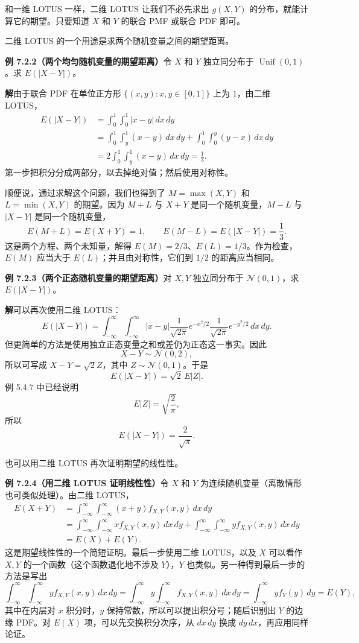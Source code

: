 \documentclass[UTF8,12pt,a4paper,fontset=fandol]{ctexart}
\begin{document}
和一维 LOTUS 一样，二维 LOTUS 让我们不必先求出 $g(X,Y)$ 的分布，就能计算它的期望。只要知道 $X$ 和 $Y$ 的联合 PMF 或联合 PDF 即可。

二维 LOTUS 的一个用途是求两个随机变量之间的期望距离。

\noindent\textbf{例 7.2.2（两个均匀随机变量的期望距离）}\quad 令 $X$ 和 $Y$ 独立同分布于 $\operatorname{Unif}(0,1)$。求 $E(|X-Y|)$。

\noindent\textbf{解}\quad 由于联合 PDF 在单位正方形 $\{(x,y):x,y\in[0,1]\}$ 上为 $1$，由二维 LOTUS，
\[
\begin{aligned}
  E(|X-Y|)
  &=\int_0^1\int_0^1 |x-y|\,dx\,dy\\
  &=\int_0^1\int_y^1 (x-y)\,dx\,dy
    +\int_0^1\int_0^y (y-x)\,dx\,dy\\
  &=2\int_0^1\int_y^1 (x-y)\,dx\,dy=\frac{1}{3}.
\end{aligned}
\]
第一步把积分分成两部分，以去掉绝对值；然后使用对称性。

顺便说，通过求解这个问题，我们也得到了 $M=\max(X,Y)$ 和 $L=\min(X,Y)$ 的期望。因为 $M+L$ 与 $X+Y$ 是同一个随机变量，$M-L$ 与 $|X-Y|$ 是同一个随机变量，
\[
  E(M+L)=E(X+Y)=1,\qquad
  E(M-L)=E(|X-Y|)=\frac{1}{3}.
\]
这是两个方程、两个未知量，解得 $E(M)=2/3$、$E(L)=1/3$。作为检查，$E(M)$ 应当大于 $E(L)$；并且由对称性，它们到 $1/2$ 的距离应当相同。

\noindent\textbf{例 7.2.3（两个正态随机变量的期望距离）}\quad 对 $X,Y$ 独立同分布于 $\mathcal{N}(0,1)$，求 $E(|X-Y|)$。

\noindent\textbf{解}\quad 可以再次使用二维 LOTUS：
\[
  E(|X-Y|)=\int_{-\infty}^{\infty}\int_{-\infty}^{\infty}
  |x-y|\frac{1}{\sqrt{2\pi}}e^{-x^2/2}
  \frac{1}{\sqrt{2\pi}}e^{-y^2/2}\,dx\,dy.
\]
但更简单的方法是使用独立正态变量之和或差仍为正态这一事实。因此
\[
  X-Y\sim \mathcal{N}(0,2),
\]
所以可写成 $X-Y=\sqrt{2}Z$，其中 $Z\sim \mathcal{N}(0,1)$。于是
\[
  E(|X-Y|)=\sqrt{2}\,E|Z|.
\]
例 5.4.7 中已经说明
\[
  E|Z|=\sqrt{\frac{2}{\pi}},
\]
所以
\[
  E(|X-Y|)=\frac{2}{\sqrt{\pi}}.
\]

也可以用二维 LOTUS 再次证明期望的线性性。

\noindent\textbf{例 7.2.4（用二维 LOTUS 证明线性性）}\quad 令 $X$ 和 $Y$ 为连续随机变量（离散情形也可类似处理）。由二维 LOTUS，
\[
\begin{aligned}
  E(X+Y)
  &=\int_{-\infty}^{\infty}\int_{-\infty}^{\infty}
  (x+y)f_{X,Y}(x,y)\,dx\,dy\\
  &=\int_{-\infty}^{\infty}\int_{-\infty}^{\infty}
  x f_{X,Y}(x,y)\,dx\,dy
  +\int_{-\infty}^{\infty}\int_{-\infty}^{\infty}
  y f_{X,Y}(x,y)\,dx\,dy\\
  &=E(X)+E(Y).
\end{aligned}
\]
这是期望线性性的一个简短证明。最后一步使用二维 LOTUS，以及 $X$ 可以看作 $X,Y$ 的一个函数（这个函数退化地不涉及 $Y$），$Y$ 也类似。另一种得到最后一步的方法是写出
\[
  \int_{-\infty}^{\infty}\int_{-\infty}^{\infty}y f_{X,Y}(x,y)\,dx\,dy
  =\int_{-\infty}^{\infty}y\int_{-\infty}^{\infty}f_{X,Y}(x,y)\,dx\,dy
  =\int_{-\infty}^{\infty}y f_Y(y)\,dy=E(Y),
\]
其中在内层对 $x$ 积分时，$y$ 保持常数，所以可以提出积分号；随后识别出 $Y$ 的边缘 PDF。对 $E(X)$ 项，可以先交换积分次序，从 $dx\,dy$ 换成 $dy\,dx$，再应用同样论证。
\end{document}
